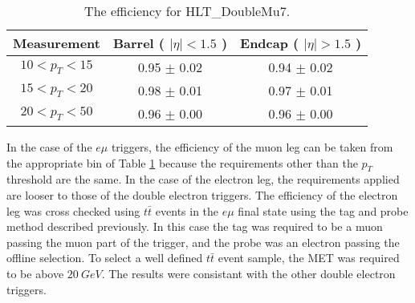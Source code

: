 %
%
%
%
%
%
%

\begin{table}[!ht]
\begin{center}
\begin{tabular}{c|c|c}
\hline
Measurement & Barrel ( $|\eta|<1.5$ )   & Endcap ( $|\eta|>1.5$ )  \\ 
\hline
$  10<p_T<  15$ & 0.95 $\pm$ 0.02  & 0.94 $\pm$ 0.02  \\ \hline 
$  15<p_T<  20$ & 0.98 $\pm$ 0.01  & 0.97 $\pm$ 0.01  \\ \hline 
$  20<p_T<  50$ & 0.96 $\pm$ 0.00  & 0.96 $\pm$ 0.00  \\ \hline 
\end{tabular}
\caption{The efficiency for HLT\_DoubleMu7.}
\label{tab:eff_mu_7_7}
\end{center}
\end{table}

In the case of the $e\mu$ triggers, the efficiency of the muon leg can be
taken from the appropriate bin of Table \ref{tab:eff_mu_7_7} because the 
requirements other than the $p_T$ threshold are the same.
In the case of the electron leg, the requirements applied are looser
to those of the double electron triggers.
The efficiency of the electron leg was cross checked using $t\bar{t}$ 
events in the $e\mu$ final state using the tag
and probe method described previously.
In this case the tag was required to be a muon passing the muon part of the
trigger, and the probe was an electron passing the offline selection.
To select a well defined $t\bar{t}$ event sample, the MET was required to be
above $20~GeV$.
The results were consistant with the other double electron triggers.

